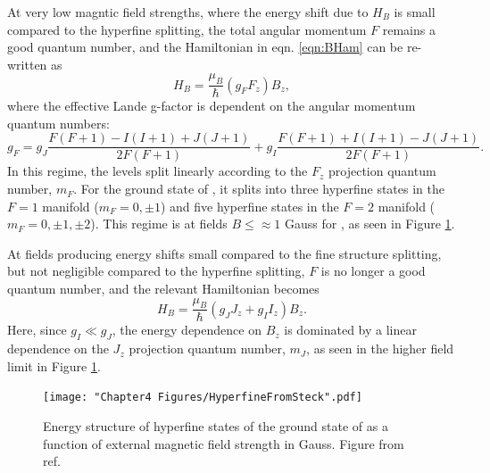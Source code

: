 At very low magntic field strengths, where the energy shift due to $H_B$ is small compared to the hyperfine splitting, the total angular momentum $F$ remains a good quantum number, and the Hamiltonian in eqn. \ref{eqn:BHam} can be re-written as
\begin{equation}
H_B = \frac{\mu_B}{\hbar}(g_F F_z) B_z,
\label{eqn:BHam}
\end{equation}
where the effective Lande g-factor is dependent on the angular momentum quantum numbers:
\begin{equation}
g_F = g_J\frac{F(F+1)-I(I+1)+J(J+1)}{2F(F+1)} + g_I\frac{F(F+1)+I(I+1)-J(J+1)}{2F(F+1)}.
\end{equation}
In this regime, the levels split linearly according to the $F_z$ projection quantum number, $m_F$. For the ground state of \Rb{}, it splits into three hyperfine states in the $F=1$ manifold ($m_F=0,\pm1$) and five hyperfine states in the $F=2$ manifold ($m_F=0,\pm1,\pm2$). This regime is at fields $B\leq\approx1$ Gauss for \Rb{}, as seen in Figure \ref{fig:hyperfineSteck}. 

At fields producing energy shifts small compared to the fine structure splitting, but not negligible compared to the hyperfine splitting, $F$ is no longer a good quantum number, and the relevant Hamiltonian becomes
\begin{equation}
H_B = \frac{\mu_B}{\hbar}(g_J J_z+g_I I_z) B_z.
\end{equation}
Here, since $g_I \ll g_J$, the energy dependence on $B_z$ is dominated by a linear dependence on the $J_z$ projection quantum number, $m_J$, as seen in the higher field limit in Figure \ref{fig:hyperfineSteck}. 

\begin{figure}
	\texttt{[image: "Chapter4 Figures/HyperfineFromSteck".pdf]}
\caption[Energy structure of hyperfine states of \Rb{}]{Energy structure of hyperfine states of the ground state of \Rb{} as a function of external magnetic field strength in Gauss.  Figure from ref. \cite{Steck}}
\label{fig:hyperfineSteck}
\end{figure}

